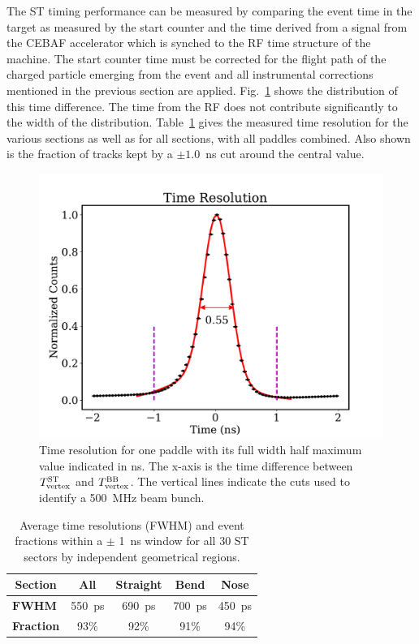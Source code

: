 The ST timing performance can be measured by comparing the event time in the target as measured by the start counter and the time derived from a signal from the CEBAF accelerator which is synched to the RF time structure of the machine. The start counter time must be corrected for the flight path of the charged particle emerging from the event and all instrumental corrections mentioned in the previous section are applied. Fig.~\ref{fig:st-time-resolution} shows the distribution of this time difference. The time from the RF does not contribute significantly to the width of the distribution. Table~\ref{table:st-time-resolution} gives the measured time resolution for the various sections as well as for all sections, with all paddles combined. Also shown is the fraction of tracks kept by a $\pm 1.0$~ns cut around the central value.

\begin{figure}[tbh]
  \centering
  \includegraphics[width=0.6\linewidth]{figures/st_tr_fit.pdf}
  \caption{Time resolution for one paddle with its full width half
    maximum value indicated in ns.  The x-axis is the time difference
    between $T^{\rm ST}_{\rm vertex}$ and $T^{\rm BB}_{\rm vertex}$.
    The vertical lines indicate the cuts used to identify a 500~MHz beam bunch.}
                \label{fig:st-time-resolution}
\end{figure}  

\begin{table}[htbp]
  \centering
  \begin{tabular}{@{} l *4c @{}}
    \hline
    \multicolumn{1}{c}{\textbf{Section}}    & \textbf{All}  & \textbf{Straight}  & \textbf{Bend}  & \textbf{Nose}  \\ 
    \hline
    $\mathbf{FWHM}$ & 550~ps & 690~ps & 700~ps & 450~ps \\ 
    \textbf{Fraction} & 93\% & 92\% & 91\% & 94\% \\\hline
  \end{tabular}
  \caption{Average time resolutions (FWHM) and event fractions within a $\pm$ 1~ns window for all 30 ST sectors by independent geometrical regions.}
  \label{table:st-time-resolution}
\end{table}  


